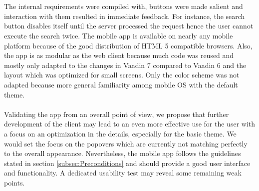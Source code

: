 \\
\\
The internal requirements were compiled with, buttons were made salient and interaction with them resulted in immediate feedback. For instance, the search button disables itself until the server processed the request hence the user cannot execute the search twice. The mobile app is available on nearly any mobile platform because of the good distribution of HTML 5 compatible browsers. Also, the app is as modular as the web client because much code was reused and mostly only adapted to the changes in Vaadin 7 compared to Vaadin 6 and the layout which was optimized for small screens. Only the color scheme was not adapted because more general familiarity among mobile OS with the default theme. 
\\
\\
Validating the app from an overall point of view, we propose that further development of the client may lead to an even more effective use for the user with a focus on an optimization in the details, especially for the basic theme. We would set the focus on the popovers which are currently not matching perfectly to the overall appearance. Nevertheless, the mobile app follows the guidelines stated in section \ref{subsec:Preconditions}  and should provide a good user interface and functionality. A dedicated usability test may reveal some remaining weak points.